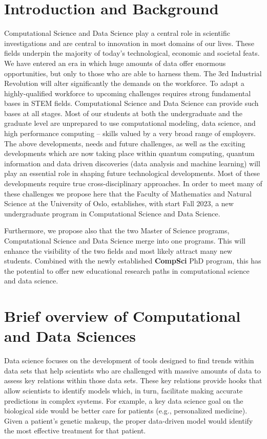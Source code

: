 \documentclass[oneside,final,10pt]{article}
\begin{document}
\section*{Introduction and Background}

Computational Science and Data Science play a central role in scientific investigations and are central to innovation in most domains of our lives. These fields underpin the majority of today's technological, economic and societal feats. We have entered an era in which huge amounts of data offer enormous opportunities, but only to those who are able to harness them. The 3rd Industrial Revolution will alter significantly the demands on the workforce. To adapt a highly-qualified workforce to upcoming challenges requires strong fundamental bases in STEM fields. Computational Science and Data Science can provide such bases at all stages. Most of our students at both the undergraduate and the graduate level are unprepared to use computational modeling, data science, and high performance computing – skills valued by a very broad range of employers. 
The above developments, needs and future challenges, as well as the exciting developments which are now taking place within quantum computing, quantum information and data driven discoveries (data analysis and machine learning) will play an essential role in shaping future technological developments. Most of these developments require true cross-disciplinary approaches.  In order to meet many of these challenges we propose here that the Faculty of Mathematics and Natural Science at the University of Oslo, establishes, with start Fall 2023, a new undergraduate program in Computational Science and Data Science.

Furthermore, we propose also that the two Master of Science programs, Computational Science and Data Science merge into one programs. This will enhance the visibility of the two fields and most likely attract many new students. Combined with the newly established {\bf CompSci} PhD program, this has the potential to offer new educational research paths in computational science and data science. 


\section*{Brief overview of Computational and Data Sciences}

Data science focuses on the development of tools designed to find trends within data sets that help scientists who are challenged with massive amounts of data to assess key relations within those data sets. These key relations provide hooks that allow scientists to identify models which, in turn, facilitate making accurate predictions in complex systems. For example, a key data science goal on the biological side would be better care for patients (e.g., personalized medicine). Given a patient’s genetic makeup, the proper data-driven model would identify the most effective treatment for that patient. 
\end{document}
